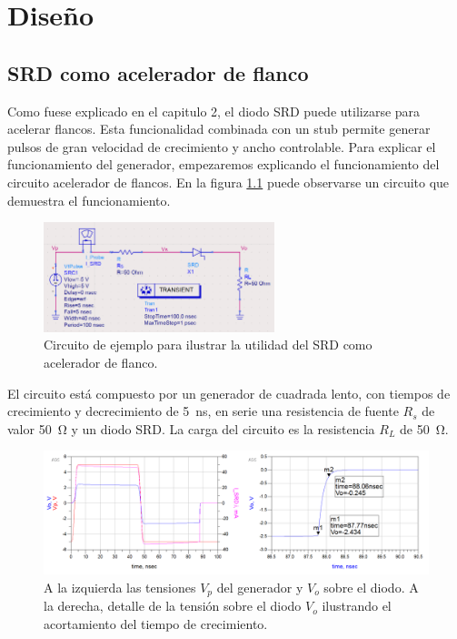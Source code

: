 \chapter{Diseño}

\section{SRD como acelerador de flanco}
\label{sec:srd_sharpener}

Como fuese explicado en el capitulo 2, el diodo SRD puede utilizarse para
acelerar flancos. Esta funcionalidad combinada con un stub permite generar
pulsos de gran velocidad de crecimiento y ancho controlable. Para explicar el
funcionamiento del generador, empezaremos explicando el funcionamiento del
circuito acelerador de flancos. En la figura \ref{fig:srd_sharpener} puede
observarse un circuito que demuestra el funcionamiento.

\begin{figure}
  \centering
    \includegraphics[width=0.6\textwidth]{images/srd_sharpener_circuit.png}
    \caption{Circuito de ejemplo para ilustrar la utilidad del SRD como
    acelerador de flanco.}
    \label{fig:srd_sharpener}
\end{figure}

El circuito está compuesto por un generador de cuadrada lento, con tiempos de
crecimiento y decrecimiento de \qty{5}{\nano\second}, en serie una resistencia
de fuente $R_s$ de valor \qty{50}{\ohm} y un diodo SRD. La carga del circuito es
la resistencia $R_L$ de \qty{50}{\ohm}.

\begin{figure}[tbp]
    \centering
    \includegraphics[width=\textwidth]{images/srd_sharpener_result.png}
    \caption{A la izquierda las tensiones $V_p$ del generador y $V_o$ sobre el
    diodo. A la derecha, detalle de la tensión sobre el diodo $V_o$ ilustrando el
    acortamiento del tiempo de crecimiento.}
    \label{fig:srd_sharpener_result}
\end{figure}

